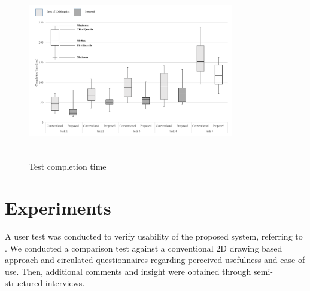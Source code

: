 


 \begin{figure}[!t]
\centering
\includegraphics[width=0.8\textwidth, height=7.8cm]{5-Experiments/completion_time}
\caption{Test completion time}
\label{fig:completion_time}
\end{figure}

\section{Experiments}




A user test was conducted to verify usability of the proposed system, referring to \cite{song_penlight:_2009, yeh_-site_2012}. We conducted a comparison test against a conventional 2D drawing based approach and circulated questionnaires regarding perceived usefulness and ease of use. Then, additional comments and insight were obtained through semi-structured interviews.


